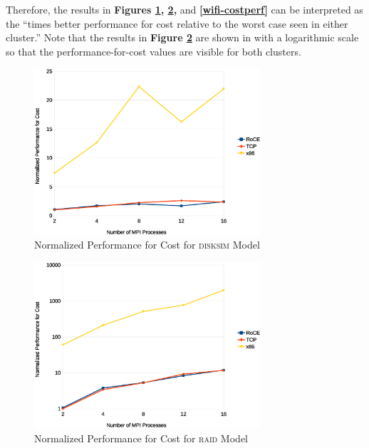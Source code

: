 \documentclass[11pt]{book}
\begin{document}
Therefore, the results in \textbf{Figures \ref{disksim-costperf},
  \ref{raid-costperf},} and \textbf{\ref{wifi-costperf}} can be interpreted as
the ``times better performance for cost relative to the worst case seen in
either cluster.'' Note that the results in \textbf{Figure \ref{raid-costperf}}
are shown in with a logarithmic scale so that the performance-for-cost values are
visible for both clusters.

\begin{figure}
\centering
\includegraphics[width=0.75\textwidth]{disksim_costperf}
\caption{Normalized Performance for Cost for \textsc{disksim} Model}
\label{disksim-costperf}
\end{figure}

\begin{figure}
\centering
\includegraphics[width=0.75\textwidth]{raid_costperf}
\caption{Normalized Performance for Cost for \textsc{raid} Model}
\label{raid-costperf}
\end{figure}
\end{document}
